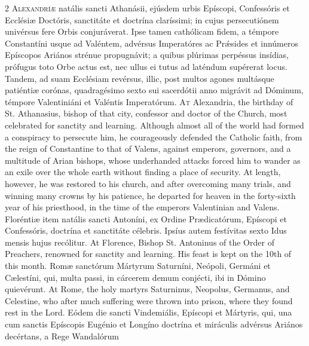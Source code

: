 \begin{paracol}{2}
\lettrine[lines=2]{A}{lexandríæ} natális 
 sancti Athanásii, ejúsdem urbis Epíscopi, Confessóris et Ecclésiæ Doctóris, 
 sanctitáte et doctrína claríssimi; in cujus persecutiónem univérsus fere 
 Orbis conjuráverat. Ipse tamen cathólicam fidem, a témpore Constantíni 
 usque ad Valéntem, advérsus Imperatóres ac Prǽsides et innúmeros Epíscopos 
 Ariános strénue propugnávit; a quibus plúrimas perpéssus insídias, prófugus 
 toto Orbe actus est, nec ullus ei tutus ad laténdum supérerat locus. 
 Tandem, ad suam Ecclésiam revérsus, illic, post multos agones multásque 
 patiéntiæ corónas, quadragésimo sexto sui sacerdótii anno migrávit ad 
 Dóminum, témpore Valentiniáni et Valéntis Imperatórum.
\switchcolumn
{}
\lettrine[lines=2]{A}{t} Alexandria, the birthday of St. 
 Athanasius, bishop of that city, confessor and doctor of the Church, most 
 celebrated for sanctity and learning. Although almost all of the world 
 had formed a conspiracy to persecute him, he courageously defended the 
 Catholic faith, from the reign of Constantine to that of Valens, against 
 emperors, governors, and a multitude of Arian bishops, whose underhanded 
 attacks forced him to wander as an exile over the whole earth without 
 finding a place of security. At length, however, he was restored to 
 his church, and after overcoming many trials, and winning many crowns by his 
 patience, he departed for heaven in the forty-sixth year of his priesthood, 
 in the time of the emperors Valentinian and Valens.
\switchcolumn*
{}
Floréntiæ item natális 
 sancti Antoníni, ex Ordine Prædicatórum, Epíscopi et Confessóris, doctrína 
 et sanctitáte célebris. Ipsíus autem festívitas sexto Idus mensis 
 hujus recólitur.
\switchcolumn
{}
At Florence, Bishop St. Antoninus 
 of the Order of Preachers, renowned for sanctity and learning. His 
 feast is kept on the 10th of this month.
\switchcolumn*
{}
Romæ sanctórum 
 Mártyrum Saturníni, Neópoli, Germáni et Cælestíni, qui, multa passi, in cárcerem demum conjécti, ibi in Dómino quievérunt.
\switchcolumn
{}
At Rome, the holy martyrs 
 Saturninus, Neopolus, Germanus, and Celestine, who after much suffering were 
 thrown into prison, where they found rest in the Lord.
\switchcolumn*
{}
Eódem die sancti 
 Vindemiális, Epíscopi et Mártyris, qui, una cum sanctis Epíscopis Eugénio et 
 Longíno doctrína et miráculis advérsus Ariános decértans, a Rege Wandalórum 

\end{paracol}
